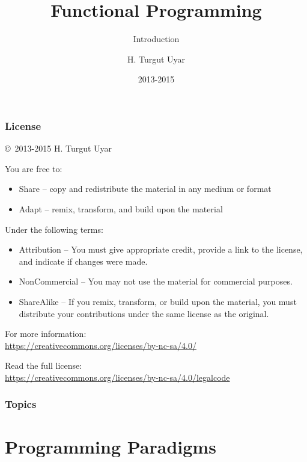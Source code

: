 \documentclass[dvipsnames]{beamer}
\title{Functional Programming}
\subtitle{Introduction}
\author{H. Turgut Uyar}
\date{2013-2015}
\theoremstyle{plain}
\begin{document}
\begin{frame}
  \titlepage
\end{frame}

\begin{frame}
  \frametitle{License}

  \hfill
  \copyright~2013-2015 H. Turgut Uyar

  \vfill
  \begin{footnotesize}
    You are free to:
    \begin{itemize}
      \itemsep0em
      \item Share -- copy and redistribute the material in any medium or format
      \item Adapt -- remix, transform, and build upon the material
    \end{itemize}

    Under the following terms:
    \begin{itemize}
      \itemsep0em
      \item Attribution -- You must give appropriate credit, provide a link to
        the license, and indicate if changes were made.

      \item NonCommercial -- You may not use the material for commercial
        purposes.

      \item ShareAlike -- If you remix, transform, or build upon the material,
        you must distribute your contributions under the same license as the
        original.
    \end{itemize}

    For more information:\\
    \url{https://creativecommons.org/licenses/by-nc-sa/4.0/}

    \smallskip
    Read the full license:\\
    \url{https://creativecommons.org/licenses/by-nc-sa/4.0/legalcode}
  \end{footnotesize}
\end{frame}

\begin{frame}
  \frametitle{Topics}
  \tableofcontents
\end{frame}

\section{Programming Paradigms}

\lstset{language=Python}
\end{document}
